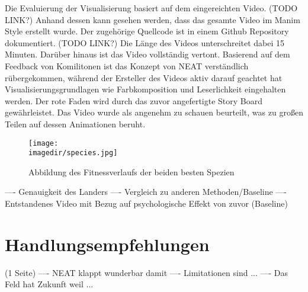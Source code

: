 Die Evaluierung der Visualisierung basiert auf dem eingereichten Video. (TODO LINK?) Anhand dessen kann gesehen werden, dass das gesamte Video im Manim Style erstellt wurde. Der zugehörige Quellcode ist in einem Github Repository dokumentiert. (TODO LINK?) Die Länge des Videos unterschreitet dabei 15 Minuten. Darüber hinaus ist das Video vollständig vertont. Basierend auf dem Feedback von Komilitonen ist das Konzept von NEAT verständlich rübergekommen, während der Ersteller des Videos aktiv darauf geachtet hat Visualisierungsgrundlagen wie Farbkomposition und Leserlichkeit eingehalten werden. Der rote Faden wird durch das zuvor angefertigte Story Board gewährleistet. Das Video wurde als angenehm zu schauen beurteilt, was zu großen Teilen auf dessen Animationen beruht. 

\begin{figure}[h] %
	\centering %
	\texttt{[image: \\imagedir/species.jpg]} %
	\caption{Abbildung des Fitnessverlaufs der beiden besten Spezien} %
\end{figure}

---- Genauigkeit des Landers
---- Vergleich zu anderen Methoden/Baseline
---- Entstandenes Video mit Bezug auf psychologische Effekt von zuvor (Baseline)

\section{Handlungsempfehlungen}
(1 Seite)
---- NEAT klappt wunderbar damit
---- Limitationen sind ...
---- Das Feld hat Zukunft weil ...